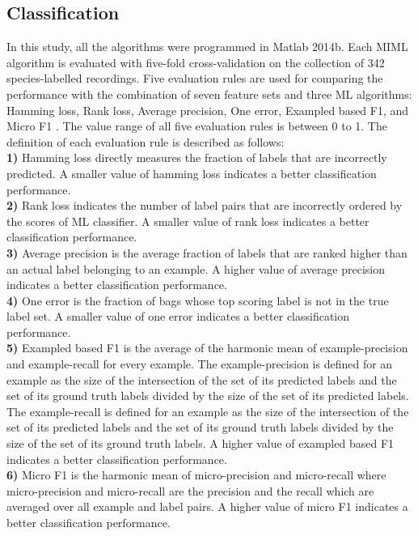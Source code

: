 \subsection{Classification}
In this study, all the algorithms were programmed in Matlab 2014b. Each MIML algorithm is evaluated with five-fold cross-validation on the collection of 342 species-labelled recordings. 
Five evaluation rules are used for comparing the performance with the combination of seven feature sets and three ML algorithms: Hamming loss, Rank loss, Average precision, One error, Exampled based F1, and Micro F1 \citep{Madjarov20123084, zhou2008miml}. The value range of all five evaluation rules is between 0 to 1. The definition of each evaluation rule is described as follows:
\\
\textbf{1)} Hamming loss directly measures the fraction of labels that are incorrectly predicted. A smaller value of hamming loss indicates a better classification performance. 
\\
\textbf{2)} Rank loss indicates the number of label pairs that are incorrectly ordered by the scores of ML classifier. A smaller value of rank loss indicates a better classification performance.
\\
\textbf{3)} Average precision is the average fraction of labels that are ranked higher than an actual label belonging to an example. A higher value of average precision indicates a better classification performance.
\\
\textbf{4)} One error is the fraction of bags whose top scoring label is not in the true label set. A smaller value of one error indicates a better classification performance.
\\
\textbf{5)}
Exampled based F1 is the average of the harmonic mean of example-precision and example-recall for every example. The example-precision is defined for an example as the size of the intersection of the set of its predicted labels and the set of its ground truth labels divided by the size of the set of its predicted labels. The example-recall is defined for an example as the size of the intersection of the set of its predicted labels and the set of its ground truth labels divided by the size of the set of its ground truth labels. A higher value of exampled based F1 indicates a better classification performance.
\\
\textbf{6)}
Micro F1 is the harmonic mean of micro-precision and micro-recall where micro-precision and micro-recall are the precision and the recall which are averaged over all example and label pairs. A higher value of micro F1 indicates a better classification performance.


